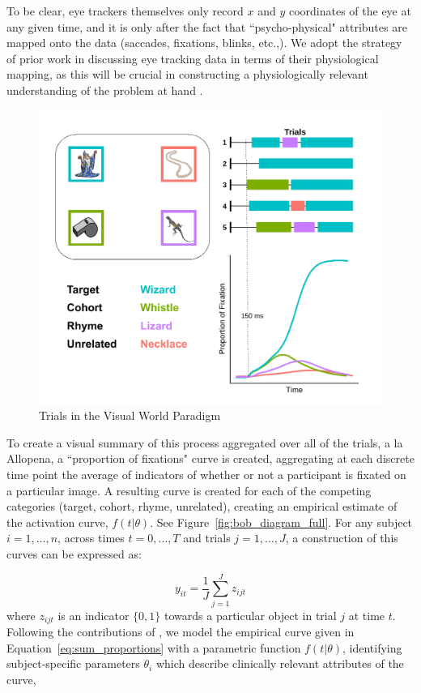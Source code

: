 \documentclass{article}
\begin{document}
To be clear, eye trackers themselves only record $x$ and $y$ coordinates of the eye at any given time, and it is only after the fact that ``psycho-physical" attributes are mapped onto the data (saccades, fixations, blinks, etc.,). We adopt the strategy of prior work in discussing eye tracking data in terms of their physiological mapping, as this will be crucial in constructing a physiologically relevant understanding of the problem at hand \cite{mcmurray2002look}.

\begin{figure}[H]
\centering
\includegraphics[scale=0.7]{collin_diagram_full.pdf}
\caption{Trials in the Visual World Paradigm}
\label{fig:collin_diagram_full}
\end{figure}


To create a visual summary of this process aggregated over all of the trials, a la Allopena, a ``proportion of fixations" curve is created, aggregating at each discrete time point the average of indicators of whether or not a participant is fixated on a particular image. A resulting curve is created for each of the competing categories (target, cohort, rhyme, unrelated), creating an empirical estimate of the activation curve, $f(t|\theta)$. See Figure~\ref{fig:bob_diagram_full}. For any subject $i = 1, \dots, n$, across times $t = 0, \dots, T$ and trials $j = 1, \dots, J$, a construction  of this curves can be expressed as:


\begin{equation}\label{eq:sum_proportions}
y_{it} = \frac1J \sum_{j=1}^J z_{ijt}
\end{equation}
where $z_{ijt}$ is an indicator $\{0, 1\}$  towards a particular object in trial $j$ at time $t$. Following the contributions of \citet{mcmurray2010individual}, we model the empirical curve given in Equation~\ref{eq:sum_proportions} with a parametric function $f(t|\theta)$, identifying subject-specific parameters $\theta_i$ which describe clinically relevant attributes of the curve, 
\end{document}
